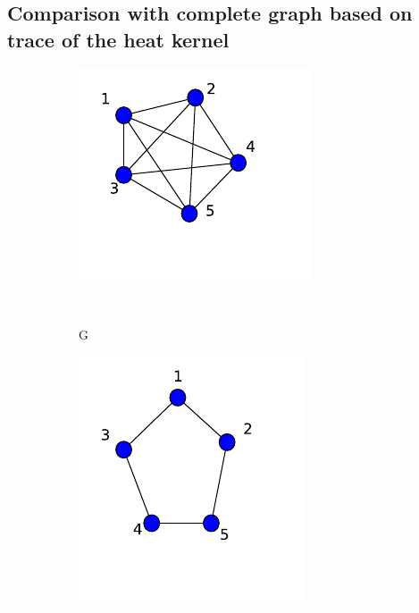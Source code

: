 \documentclass[10pt,a4paper]{article}
\theoremstyle{plain}
\theoremstyle{definition}
\begin{document}
         \subsection{Comparison with complete graph based on trace of the heat kernel}
         \begin{figure}[H]
         	\centering	\begin{subfigure}[b]{0.32\textwidth}
         		\includegraphics[width= \textwidth]{images/complete_5.pdf}
         		\caption{G}
         		\label{G}~
         	\end{subfigure}	  	\begin{subfigure}[b]{0.30\textwidth}
         		\includegraphics[width= \textwidth]{images/cycle-khop.pdf}

\end{subfigure}
\end{figure}
\end{document}
